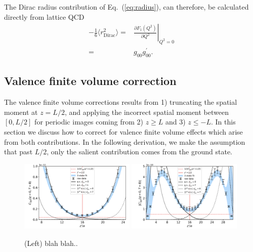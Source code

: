 \documentclass[prd,aps,twocolumn,superscriptaddress,tightenlines,nofootinbib,floatfix,preprintnumbers,10pt]{revtex4-1}
\begin{document}
The Dirac radius contribution of Eq.~(\ref{eq:radius}), can therefore, be calculated directly from lattice QCD
\begin{align}
 -\frac{1}{6}\langle r_{\mathrm{Dirac}}^2 \rangle =& \left. \frac{\partial F_1(Q^2)}{\partial
	Q^2}\right|_{Q^2=0}\nonumber \\
=&g_{00} g^\prime_{00}.
\end{align}

\subsection{Valence finite volume correction}
The valence finite volume corrections results from 1) truncating the spatial moment at $z=L/2$, and applying the incorrect spatial moment between $[0,L/2]$ for periodic images coming from 2) $z\geq L$ and 3) $z \leq -L$. In this section we discuss how to correct for valence finite volume effects which arise from both contributions. In the following derivation, we make the assumption that past $L/2$, only the salient contribution comes from the ground state.

\begin{figure}[t]{
		\includegraphics[width=0.49\textwidth]{figures/zcorr_3pt.pdf}
		\includegraphics[width=0.49\textwidth]{figures/zcorr_d3pt.pdf}
		\caption{(Left) blah blah..}
		\label{fig:finite_volume}
}\end{figure}
\end{document}
